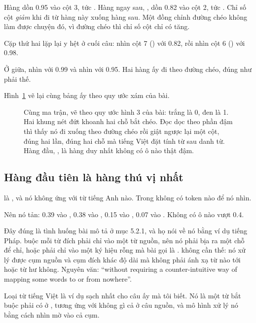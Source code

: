 Hàng  dồn 0.95 vào cột 3, tức . Hàng ngay sau,
, dồn 0.82 vào cột 2, tức . Chỉ số cột \emph{giảm} khi đi
từ hàng này xuống hàng sau. Một đồng chỉnh đường chéo không làm được chuyện đó,
vì đường chéo thì chỉ số cột chỉ có tăng.

Cặp thứ hai lặp lại y hệt ở cuối câu:  nhìn cột 7 () với
0.82, rồi  nhìn cột 6 () với 0.98.

Ở giữa,  nhìn  với 0.99 và  nhìn  với
0.95. Hai hàng ấy đi theo đường chéo, đúng như phải thế.

Hình~\ref{fig:ch06-ma-tran} vẽ lại cùng bảng ấy theo quy ước xám của bài.

\begin{figure}[htbp]
  \centering
  
  \caption{Cùng ma trận, vẽ theo quy ước hình 3 của bài: trắng là 0, đen là 1.
    Hai khung nét đứt khoanh hai chỗ bắt chéo. Đọc dọc theo phần đậm thì thấy
    nó đi xuống theo đường chéo rồi giật ngược lại một cột, đúng hai lần, đúng
    hai chỗ mà tiếng Việt đặt tính từ sau danh từ. Hàng đầu, , là
    hàng duy nhất không có ô nào thật đậm.}
  \label{fig:ch06-ma-tran}
\end{figure}

\subsection*{Hàng đầu tiên là hàng thú vị nhất}

%
 là , và nó không ứng với từ tiếng Anh nào.
Trong  không có token nào để nó nhìn.

Nên nó tản: 0.39 vào , 0.38 vào , 0.15 vào ,
0.07 vào . Không có ô nào vượt 0.4.

Đây đúng là tình huống bài mô tả ở mục 5.2.1, và họ nói về nó bằng ví dụ tiếng
Pháp.  buộc mỗi từ đích phải chỉ vào một từ
nguồn, nên nó phải bịa ra một chỗ để chỉ, hoặc phải chỉ vào một ký hiệu rỗng mà
bài gọi là \code{[NULL]}.  không cần thế: nó
xử lý được cụm nguồn và cụm đích khác độ dài mà không phải ánh xạ từ nào tới
hoặc từ hư không. Nguyên văn: \enquote{without requiring a counter-intuitive way
of mapping some words to or from nowhere}.

Loại từ tiếng Việt là ví dụ sạch nhất cho câu ấy mà tôi biết. Nó là một từ bắt
buộc phải có ở , tương ứng với không gì cả ở câu
nguồn, và mô hình xử
lý nó bằng cách nhìn mờ vào cả cụm.

